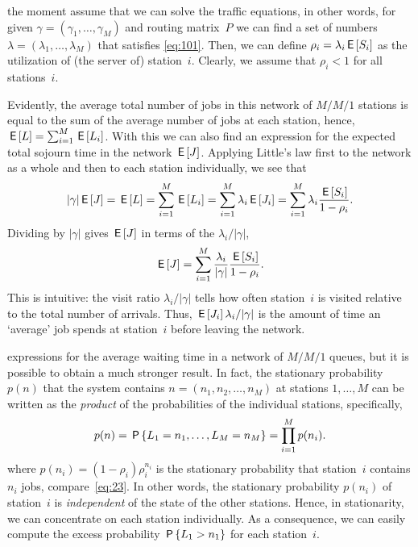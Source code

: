 \documentclass[queueing-book.tex]{subfiles}
\begin{document}
 the moment assume that we can solve the traffic equations, in other words, for given $\gamma =(\gamma_1, \ldots, \gamma_M)$ and routing matrix~$P$ we can find a set of numbers $\lambda =(\lambda_1, \ldots, \lambda_M)$  that satisfies \cref{eq:101}.
Then, we can define $\rho_i = \lambda_i \,\mathsf{E}\left[S_i\right]$ as the utilization of (the server of) station~$i$.
Clearly, we assume that $\rho_i < 1$ for all stations~$i$.

Evidently, the average total number of jobs in this network of $M/M/1$ stations is equal to the sum of the average number of jobs at each station, hence,
$\,\mathsf{E}\left[L\right] = \sum_{i=1}^M \,\mathsf{E}\left[L_i\right]$.
With this we can also find an expression for the expected total sojourn time in the network $\,\mathsf{E}\left[J\right]$.
Applying Little's law first to the network as a whole and then to each station individually, we see that
\begin{equation*}
  |\gamma| \,\mathsf{E}\left[J\right] = \,\mathsf{E}\left[L\right] = \sum_{i=1}^M \,\mathsf{E}\left[L_i\right] = \sum_{i=1}^M \lambda_i \,\mathsf{E}\left[J_i\right] = \sum_{i=1}^M \lambda_i \frac{\,\mathsf{E}\left[S_i\right]}{1-\rho_i}.
\end{equation*}
Dividing by $|\gamma|$ gives  $\,\mathsf{E}\left[J\right]$  in terms of the  $\lambda_i/|\gamma|$,
\begin{equation*}
 \,\mathsf{E}\left[J\right] = \sum_{i=1}^M \frac{\lambda_i}{|\gamma|} \frac{\,\mathsf{E}\left[S_i\right]}{1-\rho_i}.
\end{equation*}
This is intuitive: the visit ratio $\lambda_i/|\gamma|$ tells how often station~$i$ is visited relative to the total number of arrivals.
Thus, $\,\mathsf{E}\left[J_i\right] \lambda_i /|\gamma|$ is the amount of time an `average' job spends at station~$i$ before leaving the network.

 expressions for the average waiting time in a network of $M/M/1$ queues, but it is possible to obtain a much stronger result.
In fact, the stationary probability $p(n)$ that the system contains $n=(n_1,n_2, \ldots, n_M)$ at stations $1,\ldots, M$ can be written as the \emph{product} of the probabilities of the individual stations, specifically,
\begin{equation*}
p(n) =  \P{\L_1=n_1, \ldots, \L_M=n_M}  = \prod_{i=1}^M p(n_i). %
\end{equation*}
where $p(n_i)=(1-\rho_i)\rho_i^{n_i}$ is the stationary probability that station~$i$ contains $n_i$ jobs, compare~\cref{eq:23}.
In other words, the stationary probability $p(n_i)$ of station~$i$ is \emph{independent} of the state of the other stations. Hence, in stationarity, we can concentrate on each station individually. As a consequence, we can easily compute the excess probability $\,\mathsf{P}\left\{L_1> n_1\right\}$ for each station~$i$.
\end{document}
